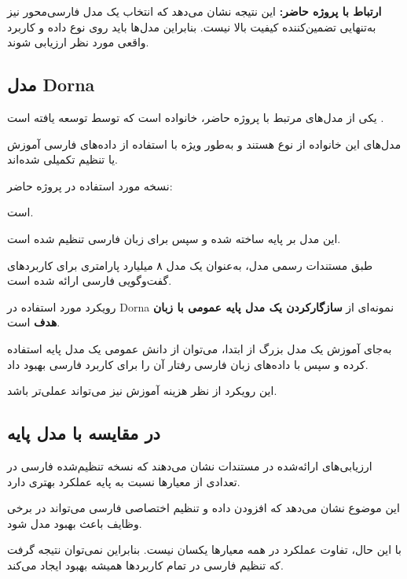 \textbf{ارتباط با پروژه حاضر:}
این نتیجه نشان می‌دهد که انتخاب یک مدل فارسی‌محور نیز
به‌تنهایی تضمین‌کننده کیفیت بالا نیست.
بنابراین مدل‌ها باید روی نوع داده و کاربرد واقعی مورد نظر
ارزیابی شوند.


\subsection{مدل Dorna}

یکی از مدل‌های مرتبط با پروژه حاضر،
خانواده
است که توسط
توسعه یافته است
\cite{dorna2modelcard}.

مدل‌های این خانواده از نوع
هستند و به‌طور ویژه با استفاده از داده‌های فارسی آموزش یا
تنظیم تکمیلی شده‌اند.

نسخه مورد استفاده در پروژه حاضر:

\begin{center}
\end{center}

است.

این مدل بر پایه
ساخته شده و سپس برای زبان فارسی تنظیم شده است.

طبق مستندات رسمی مدل،  به‌عنوان یک مدل ۸ میلیارد
پارامتری برای کاربردهای گفت‌وگویی فارسی ارائه شده است.

رویکرد مورد استفاده در Dorna نمونه‌ای از
\textbf{سازگارکردن یک مدل پایه عمومی با زبان هدف}
است.

به‌جای آموزش یک مدل بزرگ از ابتدا، می‌توان از دانش عمومی
یک مدل پایه استفاده کرده و سپس با داده‌های زبان فارسی رفتار
آن را برای کاربرد فارسی بهبود داد.

این رویکرد از نظر هزینه آموزش نیز می‌تواند عملی‌تر باشد.


\subsection{ در مقایسه با مدل پایه}

ارزیابی‌های ارائه‌شده در مستندات  نشان می‌دهند که
نسخه تنظیم‌شده فارسی در تعدادی از معیارها نسبت به
پایه عملکرد بهتری دارد.

این موضوع نشان می‌دهد که افزودن داده و تنظیم اختصاصی فارسی
می‌تواند در برخی وظایف باعث بهبود مدل شود.

با این حال، تفاوت عملکرد در همه معیارها یکسان نیست.
بنابراین نمی‌توان نتیجه گرفت که تنظیم فارسی در تمام کاربردها
همیشه بهبود ایجاد می‌کند.

